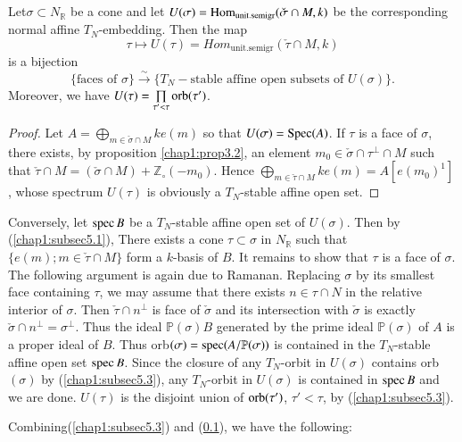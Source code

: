 \subsection{}\label{chap1:subsec5.4}%
 Let\pageoriginale $\sigma \subset N_{\mathbb{R}}$ be a cone and
let $U(\sigma) = \operatorname{Hom}_{\text{unit.semigr}}(\check{\sigma} \cap M, k)$ be
the corresponding normal affine $T_N$-embedding. Then the map  
$$
\tau \longmapsto U(\tau) =   Hom_{\text{unit.semigr}} (\check{\tau}
\cap M, k) 
$$
 is a bijection
$$
\{ \text{faces of } \sigma \} \xrightarrow{\sim} \{ T_N- \text{
   stable affine open subsets of } U(\sigma) \}.
$$ 
Moreover, we have $U(\tau) = \prod\limits_{\tau ' < \tau } \operatorname{orb}
(\tau')$.  

\begin{proof}
Let $A = \bigoplus\limits_{ m \in \check{\sigma}\cap M} ke (m)$ so
that $U(\sigma) = \operatorname{Spec}(A)$. If $\tau$ is a face of $\sigma$, there
exists, by proposition \ref{chap1:prop3.2}, an element $m_0 \in
\check{\sigma} \cap 
\tau^{\perp}\cap M$ such that $\check{\tau} \cap M = 
(\check{\sigma} \cap M) + \mathbb{Z}_\circ  (-m_0)$. Hence
$\bigoplus\limits_{m \in 
 \check{\tau} \cap M} ke(m) = A[ e(m_0)^1]$, whose spectrum
$U(\tau)$ is obviously a $T_N$-stable affine open set. 
\end{proof}

Conversely, let $\operatorname{spec} B$ be a $T_N$-stable affine open set of
$U(\sigma)$. Then by (\ref{chap1:subsec5.1}), There exists a cone $\tau \subset
\sigma$ in $N_{\mathbb{R}}$ such that $\{ e(m) ; m \in \check{\tau}
\cap M \}$ form a $k$-basis of $B$. It remains to show that $\tau$ is
a face of $\sigma$. The following argument is again due to
Ramanan. Replacing $\sigma$ by its smallest face containing $\tau$, we
may assume that there exists $ n \in \tau \cap N$ in the relative
interior of $\sigma$. Then $\check{\tau} \cap n^{\perp}$ is face of
$\check{\sigma}$ and its intersection with $\check{\sigma}$ is exactly
$\check{\sigma} \cap n^{\perp} = \sigma^{\perp}$. Thus the ideal
$\mathbb{P}(\sigma)B$ generated by the prime ideal
$\mathbb{P}(\sigma)$ of $A$  is a proper ideal of $B$. Thus
orb$(\sigma) =  \operatorname{spec} (A/\mathbb{P}(\sigma))$ is contained in the
$T_N$-stable affine open set $\operatorname{spec} B$. Since the closure of any
$T_N$-orbit in $U(\sigma)$ contains orb$(\sigma)$ by (\ref{chap1:subsec5.3}), any
$T_N$-orbit in $U(\sigma)$ is contained in $\operatorname{spec} B$ and we are
done. $U(\tau)$ is the disjoint union of $\operatorname{orb}(\tau')$, $\tau' < \tau$,
by (\ref{chap1:subsec5.3}). 

Combining\pageoriginale (\ref{chap1:subsec5.3}) and
(\ref{chap1:subsec5.4}), we have the following:    

